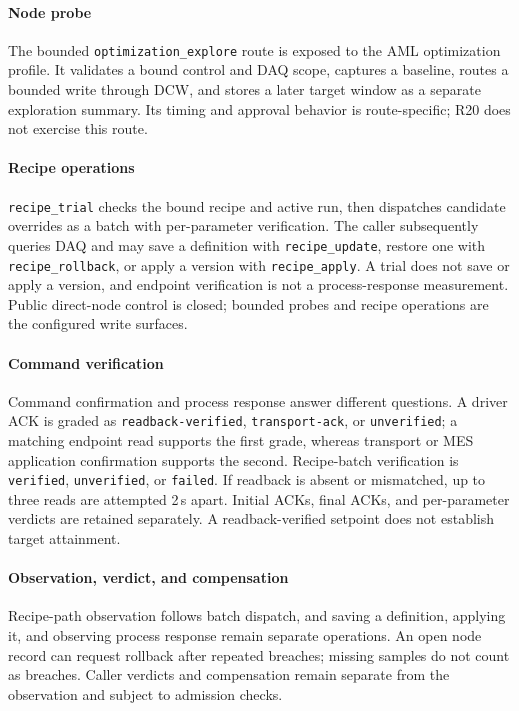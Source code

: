 \paragraph{Node probe}
The bounded \texttt{optimization\_explore} route is exposed to the AML
optimization profile. It validates a bound control and DAQ scope, captures a
baseline, routes a bounded write through DCW, and stores a later target window
as a separate exploration summary. Its timing and approval behavior is
route-specific; R20 does not exercise this route.

\paragraph{Recipe operations}
\texttt{recipe\_trial} checks the bound recipe and active run, then dispatches
candidate overrides as a batch with per-parameter verification. The caller
subsequently queries DAQ and may save a definition with
\texttt{recipe\_update}, restore one with \texttt{recipe\_rollback}, or apply
a version with \texttt{recipe\_apply}. A trial does not save or apply a
version, and endpoint verification is not a process-response measurement.
Public direct-node control is closed; bounded probes and recipe operations are
the configured write surfaces.

\paragraph{Command verification}
Command confirmation and process response answer different questions. A
driver ACK is graded as \texttt{readback-verified}, \texttt{transport-ack},
or \texttt{unverified}; a matching endpoint read supports the first grade,
whereas transport or MES application confirmation supports the second.
Recipe-batch verification is \texttt{verified}, \texttt{unverified}, or
\texttt{failed}. If readback is absent or mismatched, up to three reads are
attempted 2\,s apart. Initial ACKs, final ACKs, and per-parameter verdicts are
retained separately. A readback-verified setpoint does not establish target
attainment.

\paragraph{Observation, verdict, and compensation}
Recipe-path observation follows batch dispatch, and saving a definition,
applying it, and observing process response remain separate operations. An
open node record can request rollback after repeated breaches; missing samples
do not count as breaches. Caller verdicts and compensation remain separate
from the observation and subject to admission checks.
\label{sec:agentloop}
